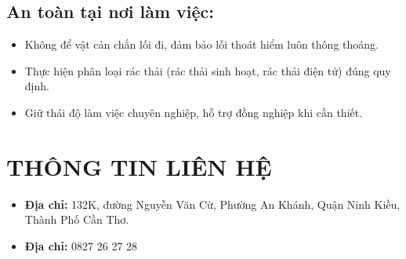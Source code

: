 \begin{itemize}
\begin{itemize}
    \subsection{An toàn tại nơi làm việc:}
    \begin{itemize}
        \item Không để vật cản chắn lối đi, đảm bảo lối thoát hiểm luôn thông thoáng.
        \item Thực hiện phân loại rác thải (rác thải sinh hoạt, rác thải điện tử) đúng quy định.
        \item Giữ thái độ làm việc chuyên nghiệp, hỗ trợ đồng nghiệp khi cần thiết.
    \end{itemize}
\end{itemize}
\end{itemize}
\section{THÔNG TIN LIÊN HỆ}
\begin{itemize}
    \item \textbf{Địa chỉ:} 132K, đường Nguyễn Văn Cừ, Phường An Khánh, Quận Ninh Kiều, Thành Phố Cần Thơ.
    \item \textbf{Địa chỉ:} 0827 26 27 28
\end{itemize}

